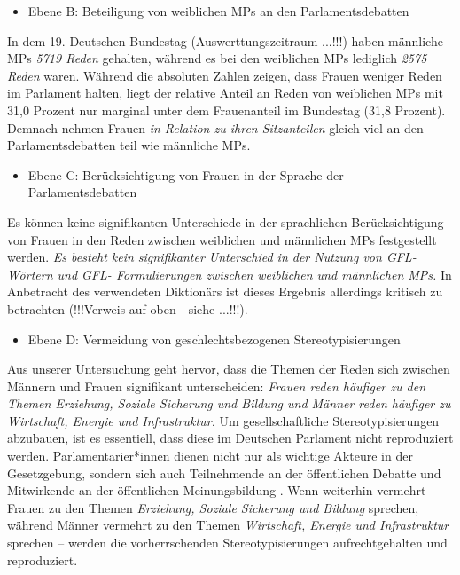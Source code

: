 \documentclass[12pt, 
    twoside=false, 
    bibliography=totoc, 
    numbers=endperiod, 
    headings=normal, 
    toc=chapterentrydotfill
    ]{scrbook}
\begin{document}
 \begin{itemize}
    \item Ebene B: Beteiligung von weiblichen MPs an den Parlamentsdebatten
\end{itemize}
    In dem 19. Deutschen Bundestag (Auswerttungszeitraum ...!!!) haben männliche MPs \emph{5719 Reden} gehalten, während es bei den weiblichen MPs lediglich \emph{2575 Reden} waren. Während die absoluten Zahlen zeigen, dass Frauen weniger Reden im Parlament halten, liegt der relative Anteil an Reden von weiblichen MPs mit 31,0 Prozent nur marginal unter dem Frauenanteil im Bundestag (31,8 Prozent). Demnach nehmen Frauen \emph{in Relation zu ihren Sitzanteilen} gleich viel an den Parlamentsdebatten teil wie männliche MPs.
    
\begin{itemize}
    \item Ebene C: Berücksichtigung von Frauen in der Sprache der Parlamentsdebatten
\end{itemize}
    Es können keine signifikanten Unterschiede in der sprachlichen Berücksichtigung von Frauen in den Reden zwischen weiblichen und männlichen MPs festgestellt werden. \emph{Es besteht kein signifikanter Unterschied in der Nutzung von GFL-Wörtern und GFL- Formulierungen zwischen weiblichen und männlichen MPs.} In Anbetracht des verwendeten Diktionärs ist dieses Ergebnis allerdings kritisch zu betrachten (!!!Verweis auf oben - siehe ...!!!).
    
\begin{itemize}
      \item Ebene D: Vermeidung von geschlechtsbezogenen Stereotypisierungen
\end{itemize}
    Aus unserer Untersuchung geht hervor, dass die Themen der Reden sich zwischen Männern und Frauen signifikant unterscheiden: \emph{Frauen reden häufiger zu den Themen Erziehung, Soziale Sicherung und Bildung und Männer reden häufiger zu Wirtschaft, Energie und Infrastruktur.} Um gesellschaftliche Stereotypisierungen abzubauen, ist es essentiell, dass diese im Deutschen Parlament nicht reproduziert werden. Parlamentarier*innen dienen nicht nur als wichtige Akteure in der Gesetzgebung, sondern sich auch Teilnehmende an der öffentlichen Debatte und Mitwirkende an der öffentlichen Meinungsbildung \parencite[188]{dahlerup_2018}. Wenn weiterhin vermehrt Frauen zu den Themen \emph{Erziehung, Soziale Sicherung und Bildung} sprechen, während Männer vermehrt zu den Themen \emph{Wirtschaft, Energie und Infrastruktur} sprechen -- werden die vorherrschenden Stereotypisierungen aufrechtgehalten und reproduziert.
    
\end{document}
